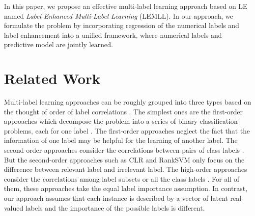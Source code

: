 \documentclass[conference]{IEEEtran}
\begin{document}
In this paper, we propose an effective multi-label learning approach based on LE named \emph{ Label Enhanced Multi-Label Learning} (LEMLL). In our approach, we formulate the problem by incorporating regression of the numerical labels and label enhancement into a unified framework, where numerical labels and predictive model are jointly learned.



\section{Related Work}
Multi-label learning approaches can be roughly grouped into three types based on the thought of order of label correlations \cite{zhang2014review}. The simplest ones are the first-order approaches which decompose the problem into a series of binary classification problems, each for one label \cite{boutell2004learning,zhang2007ml}. The first-order approaches neglect the fact that the information of one label may be helpful for the learning of another label. The second-order approaches consider the correlations between pairs of class labels \cite{elisseeff2002kernel,furnkranz2008multilabel}. But the second-order approaches such as CLR \cite{furnkranz2008multilabel} and RankSVM \cite{elisseeff2002kernel} only focus on the difference between relevant label and irrelevant label. The high-order approaches consider the correlations among label subsets or all the class labels \cite{read2011classifier,tsoumakas2011random}. For all of them, these approaches take the equal label importance assumption. In contrast, our approach assumes that each instance is described by a vector of latent real-valued labels and the importance of the possible labels is different.
\end{document}
